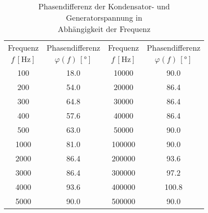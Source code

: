 \begin{table}[!h]
	\centering
	\begin{tabular}{|c|c||c|c|}
		\hline
		     Frequenz      &       Phasendifferenz        &      Frequenz      &       Phasendifferenz        \\
		$f\,[\si{\hertz}]$ & $\varphi(f)\,[\si{\degree}]$ & $f\,[\si{\hertz}]$ & $\varphi(f)\,[\si{\degree}]$ \\ \hline\hline
		    \num{100}      &         \num{18.0}         &    \num{10000}     &         \num{90.0}         \\
		    \num{200}      &         \num{54.0}         &    \num{20000}     &         \num{86.4}         \\
		    \num{300}      &         \num{64.8}         &    \num{30000}     &         \num{86.4}         \\
		    \num{400}      &         \num{57.6}         &    \num{40000}     &         \num{86.4}         \\
		    \num{500}      &         \num{63.0}         &    \num{50000}     &         \num{90.0}         \\
		    \num{1000}     &         \num{81.0}         &    \num{100000}    &         \num{90.0}         \\
		    \num{2000}     &         \num{86.4}         &    \num{200000}    &         \num{93.6}         \\
		    \num{3000}     &         \num{86.4}         &    \num{300000}    &         \num{97.2}         \\
		    \num{4000}     &         \num{93.6}         &    \num{400000}    &        \num{100.8}         \\
		    \num{5000}     &         \num{90.0}         &    \num{500000}    &         \num{90.0}         \\ \hline
	\end{tabular}
	\caption{Phasendifferenz der Kondensator- und Generatorspannung in\\\hspace*{1.9cm} Abhängigkeit der Frequenz \label{tab:Auswertung_Phasendifferenz}}
\end{table}